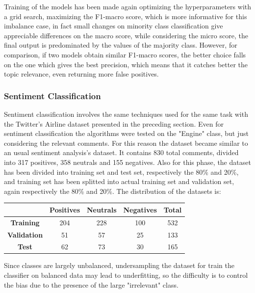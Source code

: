 Training of the models has been made again optimizing the hyperparameters with a grid search, maximizing the F1-macro score, which is more informative for this imbalance case, in fact small changes on minority class classification give appreciable differences on the macro score, while considering the micro score, the final output is predominated by the values of the majority class. However, for comparison, if two models obtain similar F1-macro scores, the better choice falls on the one which gives the best precision, which means that it catches better the topic relevance, even returning more false positives.



\subsubsection{Sentiment Classification}

Sentiment classification involves the same techniques used for the same task with the Twitter's Airline dataset presented in the preceding section. Even for sentiment classification the algorithms were tested on the "Engine" class, but just considering the relevant comments. For this reason the dataset became similar to an usual sentiment analysis's dataset. It contains 830 total comments, divided into 317 positives, 358 neutrals and 155 negatives. Also for this phase, the dataset has been divided into training set and test set, respectively the 80\% and 20\%, and training set has been splitted into actual training set and validation set, again respectively the 80\% and 20\%. The distribution of the datasets is:

\begin{center}
	\begin{tabular}{ | c  c  c c | c | } 
		\hline
		& \textbf{Positives} & \textbf{Neutrals} & \textbf{Negatives} & \textbf{Total} \\
		\hline
		\textbf{Training} & 204 & 228 & 100 & 532 \\ 
		\hline
		\textbf{Validation} & 51 & 57 & 25 & 133 \\ 
		\hline
		\textbf{Test} & 62 & 73 & 30 & 165 \\
		\hline
	\end{tabular}
\end{center}

Since classes are largely unbalanced, undersampling the dataset for train the classifier on balanced data may lead to underfitting, so the difficulty is to control the bias due to the presence of the large "irrelevant" class.



